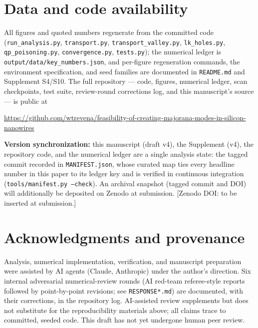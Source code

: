 \documentclass[11pt]{article}
\begin{document}
\section*{Data and code availability}
All figures and quoted numbers regenerate from the committed code
(\texttt{run\_analysis.py}, \texttt{transport.py}, \texttt{transport\_valley.py},
\texttt{lk\_holes.py}, \texttt{qp\_poisoning.py}, \texttt{convergence.py},
\texttt{tests.py}); the numerical ledger is \texttt{output/data/key\_numbers.json},
and per-figure regeneration commands, the environment specification, and seed
families are documented in \texttt{README.md} and Supplement S4/S10. The full
repository --- code, figures, numerical ledger, scan checkpoints, test suite,
review-round corrections log, and this manuscript's source --- is public at
\begin{center}
\url{https://github.com/wtrevena/feasibility-of-creating-majorana-modes-in-silicon-nanowires}
\end{center}
\textbf{Version synchronization:} this manuscript (draft v4), the
Supplement (v4), the repository code, and the numerical ledger are a single
analysis state: the tagged commit recorded in \texttt{MANIFEST.json}, whose
curated map ties every headline number in this paper to its ledger key and
is verified in continuous integration (\texttt{tools/manifest.py --check}).
An archival snapshot (tagged commit and DOI) will additionally be deposited
on Zenodo at submission. [Zenodo DOI: to be inserted at submission.]

\section*{Acknowledgments and provenance}
Analysis, numerical implementation, verification, and manuscript preparation
were assisted by AI agents (Claude, Anthropic) under the author's direction.
Six internal adversarial numerical-review rounds (AI red-team referee-style
reports followed by point-by-point revisions; see \texttt{RESPONSE*.md}) are
documented, with their corrections, in the repository log. AI-assisted review
supplements but does not substitute for the reproducibility materials above;
all claims trace to committed, seeded code. This draft has not yet undergone
human peer review.
\end{document}
